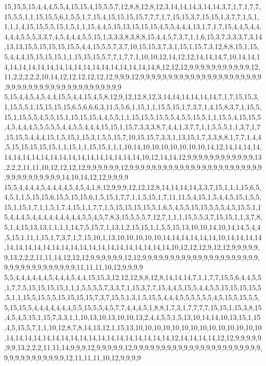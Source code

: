 15,15,5,15,4,4,4,5,5,4,15,15,4,15,5,5,7,12,8,8,12,8,12,3,14,14,14,3,14,14,3,7,1,7,1,7,7,15,5,5,1,1,15,15,5,6,1,5,5,1,7,15,4,15,15,15,15,7,7,7,1,7,15,15,3,7,15,15,1,3,7,7,1,5,1,1,1,1,4,15,15,5,5,15,1,5,1,1,15,4,4,5,15,13,15,15,15,4,5,5,4,4,4,13,1,7,1,7,15,4,4,5,4,4,4,4,4,5,5,5,3,3,7,4,5,4,4,4,5,5,15,1,3,3,3,8,3,8,8,15,4,4,5,7,3,7,1,1,6,15,3,7,3,3,3,7,3,14,13,13,15,5,15,15,15,15,5,4,4,15,5,5,7,3,7,10,15,15,3,7,3,1,15,1,15,7,3,12,8,8,15,1,15,5,4,4,4,15,15,15,15,1,1,15,15,15,5,7,7,1,7,7,1,10,10,12,14,12,12,14,14,14,7,10,14,14,14,14,14,14,14,14,14,14,14,14,14,14,14,14,14,14,14,8,12,12,12,9,9,9,9,9,9,9,9,9,9,9,12,11,2,2,2,2,2,10,14,12,12,12,12,12,12,9,9,9,12,9,9,9,9,9,9,9,9,9,9,9,9,9,9,9,9,9,9,9,9,9,9,9,9,9,9,9,9,9,9,9,9,9,9,9,9,9,9,9,9,9,9,9
5,15,4,4,5,4,5,4,4,15,5,4,4,15,4,5,8,12,9,12,12,8,12,3,14,14,14,14,14,14,7,1,7,15,15,3,1,15,5,5,1,15,15,15,15,6,5,6,6,6,3,11,5,5,6,1,15,1,1,15,5,15,1,7,3,7,1,4,15,8,3,7,1,15,5,15,1,15,5,5,4,5,5,15,1,15,15,15,4,4,5,5,1,1,15,15,5,15,5,5,4,5,5,15,5,1,1,15,5,4,15,15,5,4,5,4,4,4,5,5,5,5,5,4,4,5,5,4,4,4,15,15,1,15,7,3,3,3,8,7,4,4,1,3,7,7,1,1,5,5,5,1,1,3,7,1,7,15,15,5,4,4,4,15,1,5,15,1,15,3,1,5,5,15,7,10,15,15,7,3,3,1,13,15,1,7,3,3,8,8,1,7,7,1,4,4,5,15,15,15,15,15,1,1,15,1,1,15,15,1,1,1,10,14,10,10,10,10,10,10,10,14,12,14,14,14,14,14,14,14,14,14,14,14,14,14,14,14,14,14,14,14,10,12,14,14,12,9,9,9,9,9,9,9,9,9,9,9,9,13,2,2,2,11,11,10,12,12,12,12,9,9,9,9,9,9,12,9,9,9,9,9,9,9,9,9,9,9,9,9,9,9,9,9,9,9,9,9,9,9,9,9,9,9,9,9,9,9,9,9,9,14,10,14,12,12,9,9,9,9
15,5,4,4,4,4,5,4,4,4,4,5,4,5,4,1,8,12,9,9,9,12,12,12,8,14,14,14,14,3,3,7,15,1,1,1,15,6,5,4,5,1,1,5,15,15,6,15,5,15,15,6,1,5,15,1,7,7,1,1,5,15,1,7,11,11,5,4,15,1,5,4,4,5,15,1,5,5,15,1,15,1,7,1,1,5,1,7,4,15,1,1,7,7,1,5,15,15,15,15,5,1,6,5,4,5,5,15,15,5,5,5,4,5,15,5,1,15,4,4,4,5,4,4,4,4,4,4,4,4,4,5,5,4,5,7,8,3,15,5,5,5,7,12,7,1,1,1,15,5,5,3,7,15,15,1,1,3,7,8,5,1,4,15,13,13,1,1,1,1,14,7,5,15,7,1,13,1,2,15,15,1,1,5,5,15,13,10,10,14,10,14,14,5,4,4,5,15,1,11,1,15,1,7,3,7,1,7,15,10,1,13,10,10,10,10,10,14,14,14,14,14,14,10,14,14,14,14,14,14,14,14,14,14,14,14,14,14,14,14,14,14,14,14,14,14,10,12,12,12,9,12,12,9,9,9,9,9,9,13,2,2,2,11,11,14,12,12,12,9,9,9,9,9,9,12,12,9,9,9,9,9,9,9,9,9,9,9,9,9,9,9,9,9,9,9,9,9,9,9,9,9,9,9,9,9,9,9,9,9,9,11,11,11,10,12,9,9,9,9
5,5,4,4,4,4,4,4,5,4,4,4,5,4,4,15,15,3,12,12,12,8,8,12,8,14,14,14,7,1,1,7,7,15,5,6,4,4,5,5,1,7,7,5,15,15,15,15,1,1,1,5,5,5,5,7,3,3,7,1,15,3,7,7,15,4,4,5,15,5,4,4,5,5,15,15,15,15,5,5,1,1,15,5,15,5,5,15,15,15,15,7,3,7,15,5,1,3,1,5,15,5,4,4,4,5,5,5,5,5,5,4,5,15,5,15,5,5,5,15,15,5,4,4,4,4,4,4,4,5,5,15,5,5,4,5,7,7,4,4,4,5,1,8,8,1,7,3,1,7,7,7,7,15,15,1,15,3,8,15,4,5,4,5,15,1,15,7,3,3,1,1,10,13,10,13,10,10,13,2,4,4,5,5,1,5,13,10,14,14,10,13,15,1,15,4,5,15,5,7,1,1,10,12,8,7,8,14,13,12,1,15,13,10,10,10,10,10,10,10,10,10,10,10,10,10,10,14,14,14,14,14,14,14,14,14,14,14,14,14,14,14,14,14,14,12,14,14,14,14,12,12,9,9,9,9,9,9,9,13,2,2,2,11,11,14,9,9,9,12,9,9,9,9,9,12,9,9,9,9,9,9,9,9,9,9,9,9,9,9,9,9,9,9,9,9,9,9,9,9,9,9,9,9,9,9,9,9,9,9,12,11,11,11,10,12,9,9,9,9
